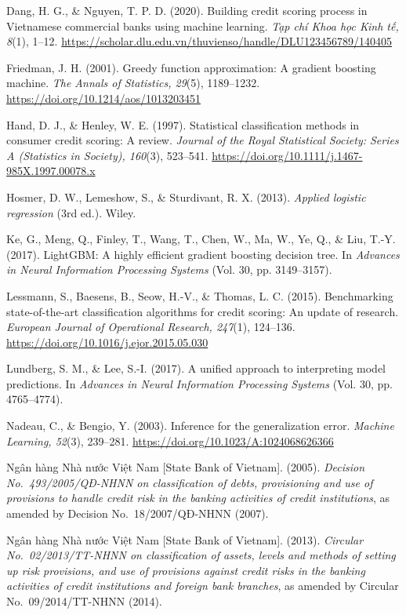 \documentclass[11pt,a4paper]{article}
\newcommand{\refitem}[1]{\par\noindent\hangindent=1cm\hangafter=1 #1\par\smallskip}
\begin{document}
\refitem{Dang, H. G., \& Nguyen, T. P. D. (2020). Building credit scoring process in Vietnamese commercial banks using machine learning. \textit{Tạp chí Khoa học Kinh tế, 8}(1), 1--12. \url{https://scholar.dlu.edu.vn/thuvienso/handle/DLU123456789/140405}}

\refitem{Friedman, J. H. (2001). Greedy function approximation: A gradient boosting machine. \textit{The Annals of Statistics, 29}(5), 1189--1232. \url{https://doi.org/10.1214/aos/1013203451}}

\refitem{Hand, D. J., \& Henley, W. E. (1997). Statistical classification methods in consumer credit scoring: A review. \textit{Journal of the Royal Statistical Society: Series A (Statistics in Society), 160}(3), 523--541. \url{https://doi.org/10.1111/j.1467-985X.1997.00078.x}}

\refitem{Hosmer, D. W., Lemeshow, S., \& Sturdivant, R. X. (2013). \textit{Applied logistic regression} (3rd ed.). Wiley.}

\refitem{Ke, G., Meng, Q., Finley, T., Wang, T., Chen, W., Ma, W., Ye, Q., \& Liu, T.-Y. (2017). LightGBM: A highly efficient gradient boosting decision tree. In \textit{Advances in Neural Information Processing Systems} (Vol. 30, pp. 3149--3157).}

\refitem{Lessmann, S., Baesens, B., Seow, H.-V., \& Thomas, L. C. (2015). Benchmarking state-of-the-art classification algorithms for credit scoring: An update of research. \textit{European Journal of Operational Research, 247}(1), 124--136. \url{https://doi.org/10.1016/j.ejor.2015.05.030}}

\refitem{Lundberg, S. M., \& Lee, S.-I. (2017). A unified approach to interpreting model predictions. In \textit{Advances in Neural Information Processing Systems} (Vol. 30, pp. 4765--4774).}

\refitem{Nadeau, C., \& Bengio, Y. (2003). Inference for the generalization error. \textit{Machine Learning, 52}(3), 239--281. \url{https://doi.org/10.1023/A:1024068626366}}

\refitem{Ngân hàng Nhà nước Việt Nam [State Bank of Vietnam]. (2005). \textit{Decision No.\ 493/2005/QĐ-NHNN on classification of debts, provisioning and use of provisions to handle credit risk in the banking activities of credit institutions}, as amended by Decision No.\ 18/2007/QĐ-NHNN (2007).}

\refitem{Ngân hàng Nhà nước Việt Nam [State Bank of Vietnam]. (2013). \textit{Circular No.\ 02/2013/TT-NHNN on classification of assets, levels and methods of setting up risk provisions, and use of provisions against credit risks in the banking activities of credit institutions and foreign bank branches}, as amended by Circular No.\ 09/2014/TT-NHNN (2014).}
\end{document}
